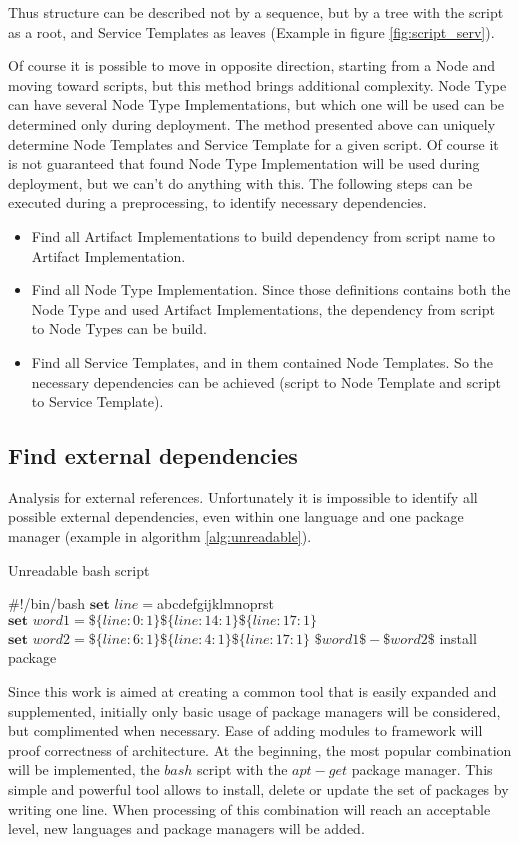 Thus structure can be described not by a sequence, but by a tree with the script as a root, and Service Templates as leaves (Example in figure \ref{fig:script_serv}). 

Of course it is possible to move in opposite direction, starting from a Node and moving toward scripts, but this method brings additional complexity. 
Node Type can have several Node Type Implementations, but which one will be used can be determined only during deployment. 
The method presented above can uniquely determine Node Templates and Service Template for a given script.
Of course it is not guaranteed that found Node Type Implementation will be used during deployment, but we can't do anything with this. 
The following steps can be executed during a preprocessing, to identify necessary dependencies.
\begin{itemize}
	\item Find all Artifact Implementations to build dependency from script name to Artifact Implementation.
	\item Find all Node Type Implementation. Since those definitions contains both the Node Type and used Artifact Implementations, the dependency from script to Node Types can be build.
	\item Find all Service Templates, and in them contained Node Templates. So the necessary dependencies can be achieved (script to Node Template and script to Service Template).
\end{itemize}
\subsection*{Find external dependencies}
Analysis for external references.
Unfortunately it is impossible to identify all possible external dependencies, even within one language and one package manager (example in algorithm \ref{alg:unreadable}).
\begin{Algorithmus} 
	\caption{Unreadable bash script}
	\label{alg:unreadable}
	\begin{algorithmic}
		\State	\#!/bin/bash
		\State	$\textbf{set } line = $abcdefgijklmnoprst
		\State	$\textbf{set } word1 = \$\{line:0:1\}\$\{line:14:1\}\$\{line:17:1\}$ 
		\State  $\textbf{set } word2 = \$\{line:6:1\}\$\{line:4:1\}\$\{line:17:1\}$
		\State  $\$word1\$-\$word2\$$ install package
	\end{algorithmic}
\end{Algorithmus}
Since this work is aimed at creating a common tool that is easily expanded and supplemented, initially only basic usage of package managers will be considered, but complimented when necessary. 
Ease of adding modules to framework will proof correctness of architecture.
At the beginning, the most popular combination will be implemented, the $bash$ script with the $apt-get$ package manager.
This simple and powerful tool allows to install, delete or update the set of packages by writing one line.
When processing of this combination will reach an acceptable level, new languages and package managers will be added.
